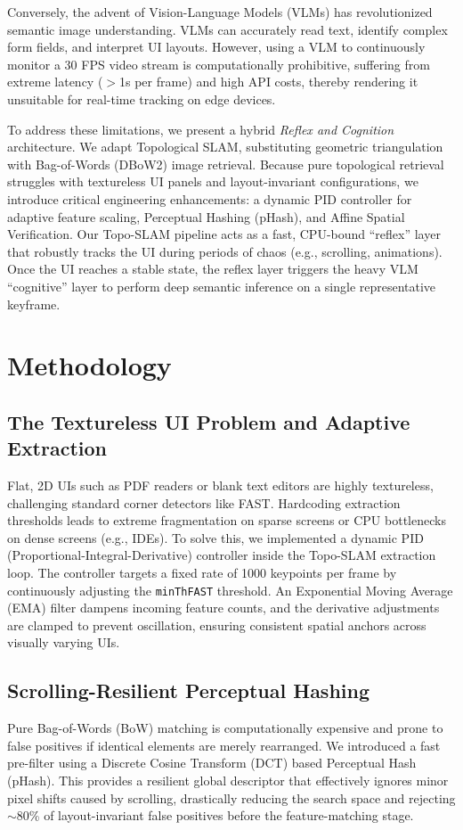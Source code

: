 \documentclass[journal]{IEEEtran}
\begin{document}
Conversely, the advent of Vision-Language Models (VLMs) has revolutionized semantic image understanding. VLMs can accurately read text, identify complex form fields, and interpret UI layouts. However, using a VLM to continuously monitor a 30 FPS video stream is computationally prohibitive, suffering from extreme latency ($>$1s per frame) and high API costs, thereby rendering it unsuitable for real-time tracking on edge devices.

To address these limitations, we present a hybrid \textit{Reflex and Cognition} architecture. We adapt Topological SLAM, substituting geometric triangulation with Bag-of-Words (DBoW2) image retrieval. Because pure topological retrieval struggles with textureless UI panels and layout-invariant configurations, we introduce critical engineering enhancements: a dynamic PID controller for adaptive feature scaling, Perceptual Hashing (pHash), and Affine Spatial Verification. Our Topo-SLAM pipeline acts as a fast, CPU-bound ``reflex'' layer that robustly tracks the UI during periods of chaos (e.g., scrolling, animations). Once the UI reaches a stable state, the reflex layer triggers the heavy VLM ``cognitive'' layer to perform deep semantic inference on a single representative keyframe.

\section{Methodology}

\subsection{The Textureless UI Problem and Adaptive Extraction}
Flat, 2D UIs such as PDF readers or blank text editors are highly textureless, challenging standard corner detectors like FAST. Hardcoding extraction thresholds leads to extreme fragmentation on sparse screens or CPU bottlenecks on dense screens (e.g., IDEs). To solve this, we implemented a dynamic PID (Proportional-Integral-Derivative) controller inside the Topo-SLAM extraction loop. The controller targets a fixed rate of 1000 keypoints per frame by continuously adjusting the \texttt{minThFAST} threshold. An Exponential Moving Average (EMA) filter dampens incoming feature counts, and the derivative adjustments are clamped to prevent oscillation, ensuring consistent spatial anchors across visually varying UIs.

\subsection{Scrolling-Resilient Perceptual Hashing}
Pure Bag-of-Words (BoW) matching is computationally expensive and prone to false positives if identical elements are merely rearranged. We introduced a fast pre-filter using a Discrete Cosine Transform (DCT) based Perceptual Hash (pHash). This provides a resilient global descriptor that effectively ignores minor pixel shifts caused by scrolling, drastically reducing the search space and rejecting $\sim$80\% of layout-invariant false positives before the feature-matching stage.
\end{document}
